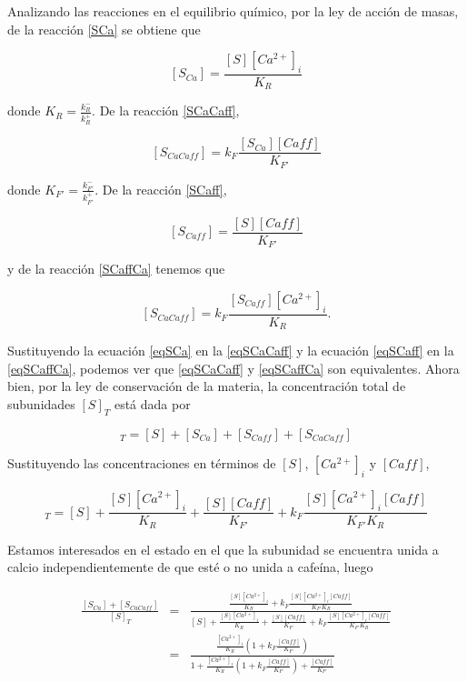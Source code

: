\documentclass[draft]{article}
\newcommand{\Cai}{[Ca^{2+}]_{i}}
\begin{document}
Analizando las reacciones en el equilibrio químico, por la ley de acción de masas, de la reacción \ref{SCa} se obtiene que

\begin{equation}\label{eqSCa}
[S_{Ca}] = \frac{[S]\Cai}{K_R}
\end{equation}

donde $K_R = \frac{k^{-}_R}{k^{+}_R}$. De la reacción \ref{SCaCaff},

\begin{equation}\label{eqSCaCaff}
[S_{CaCaff}] = k_F\frac{[S_{Ca}][Caff]}{K_{F'}}
\end{equation}

donde $K_{F'} = \frac{k^{-}_{F'}}{k^{+}_{F'}}$. De la reacción \ref{SCaff},

\begin{equation}\label{eqSCaff}
[S_{Caff}] = \frac{[S][Caff]}{K_{F'}}
\end{equation}

y de la reacción \ref{SCaffCa} tenemos que

\begin{equation}\label{eqSCaffCa}
[S_{CaCaff}] = k_F\frac{[S_{Caff}]\Cai}{K_R}.
\end{equation}

Sustituyendo la ecuación \ref{eqSCa} en la \ref{eqSCaCaff} y la ecuación \ref{eqSCaff} en la \ref{eqSCaffCa}, podemos ver que \ref{eqSCaCaff} y \ref{eqSCaffCa} son equivalentes. Ahora bien, por la ley de conservación de la materia, la concentración total de subunidades $[S]_T$ está dada por

\begin{equation}
[S]_T = [S] + [S_{Ca}] + [S_{Caff}] + [S_{CaCaff}]
\end{equation}

Sustituyendo las concentraciones en términos de $[S]$, $\Cai$ y $[Caff]$,

\begin{equation}
[S]_T = [S] + \frac{[S]\Cai}{K_R} + \frac{[S][Caff]}{K_{F'}} + k_F\frac{[S]\Cai[Caff]}{K_{F'}K_R}
\end{equation}

Estamos interesados en el estado en el que  la subunidad se encuentra unida a calcio independientemente de que esté o no unida a cafeína, luego

\begin{eqnarray} \label{expresion}
\frac{[S_{Ca}] + [S_{CaCaff}]}{[S]_T} & = &\frac{\frac{[S]\Cai}{K_R} + k_F\frac{[S]\Cai[Caff]}{K_{F'}K_R}}{[S] + \frac{[S]\Cai}{K_R} + \frac{[S][Caff]}{K_{F'}} + k_F\frac{[S]\Cai[Caff]}{K_{F'}K_R}} \nonumber \\ 
& = & \frac{\frac{\Cai}{K_R}\left(1 + k_F\frac{[Caff]}{K_{F'}}\right)}{1 + \frac{\Cai}{K_R}\left(1 + k_F \frac{[Caff]}{K_{F'}}\right) + \frac{[Caff]}{K_{F'}}}
\end{eqnarray}
\end{document}
